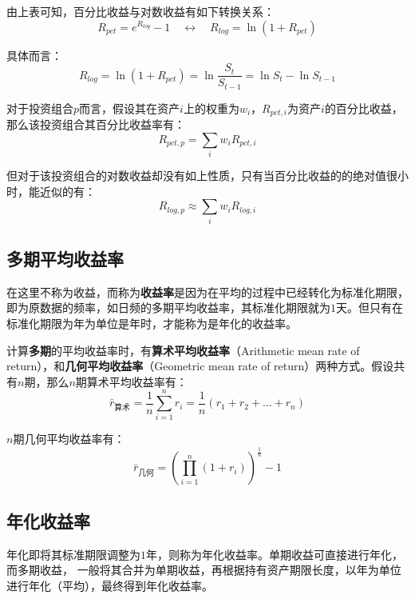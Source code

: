 \documentclass[11pt]{article}
\begin{document}
由上表可知，百分比收益与对数收益有如下转换关系：
\begin{equation*}
    R_{pct} = e^{R_{log}} - 1 \quad\leftrightarrow\quad R_{log} = \ln (1+R_{pct}) 
\end{equation*}

具体而言：
\begin{equation*}
    R_{log} = \ln (1 + R_{pct}) = \ln \frac{S_t}{S_{t-1}} = \ln S_t - \ln S_{t-1}
\end{equation*}

对于投资组合$p$而言，假设其在资产$i$上的权重为$w_i$，$R_{pct,i}$为资产$i$的百分比收益，那么该投资组合其百分比收益率有：
\begin{equation*}
    R_{pct,p} = \sum_i w_i R_{pct,i}
\end{equation*}

但对于该投资组合的对数收益却没有如上性质，只有当百分比收益的的绝对值很小时，能近似的有：
\begin{equation*}
    R_{log,p} \approx \sum_i w_i R_{log,i}
\end{equation*}

\subsection{多期平均收益率}

在这里不称为收益，而称为\textbf{收益率}是因为在平均的过程中已经转化为标准化期限，即为原数据的频率，如日频的多期平均收益率，其标准化期限就为$1$天。但只有在标准化期限为年为单位是年时，才能称为是年化的收益率。

计算\textbf{多期}的平均收益率时，有\textbf{算术平均收益率}（Arithmetic mean rate of return），和\textbf{几何平均收益率}（Geometric mean rate of return）两种方式。假设共有$n$期，那么$n$期算术平均收益率有：
\begin{equation*}
    \bar{r}_{\text{算术}} = \frac{1}{n} \sum^{n}_{i=1} r_i = \frac{1}{n} (r_1 + r_2 + \dots + r_n)
\end{equation*}

$n$期几何平均收益率有：
\begin{equation*}
    \bar{r}_{\text{几何}} = \left( \prod^{n}_{i=1}(1+r_i) \right)^{\frac{1}{n}} - 1
\end{equation*}

\subsection{年化收益率}

年化即将其标准期限调整为$1$年，则称为年化收益率。单期收益可直接进行年化，而多期收益，
一般将其合并为单期收益，再根据持有资产期限长度，以年为单位进行年化（平均），最终得到年化收益率。
\end{document}
